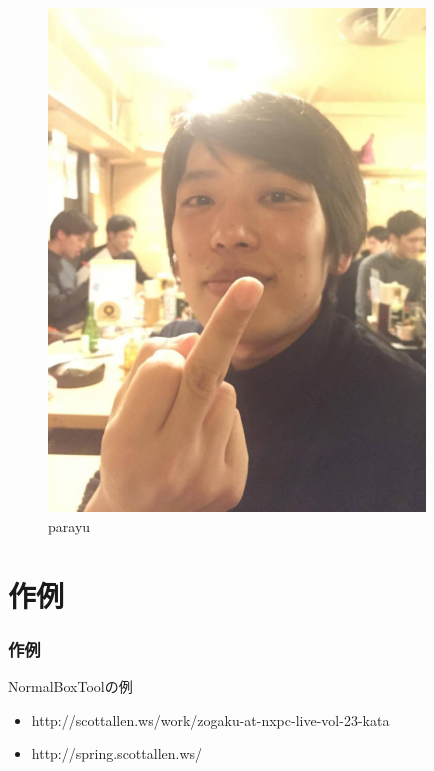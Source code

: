 \documentclass[10pt, dvipdfmx]{beamer}
\begin{document}
        \begin{frame}
            \frametitle{}
                \begin{figure}[htb]
                    \includegraphics[width=100mm]{images/05.png}
                    \caption{parayu}
                    \label{fig:03}
                \end{figure}
        \end{frame}

    \section{作例}
        \begin{frame}
            \frametitle{作例}
            \begin{block}{NormalBoxToolの例}
                \begin{itemize}
                    \item http://scottallen.ws/work/zogaku-at-nxpc-live-vol-23-kata
                    \item http://spring.scottallen.ws/
                \end{itemize}
            \end{block}
        \end{frame}
\end{document}
